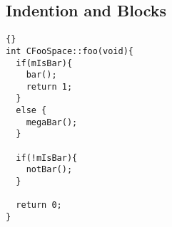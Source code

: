 \documentclass[final,a4paper,10pt, oneside]{article}
\begin{document}
\newpage
\subsection{Indention and Blocks} \label{subsec:IndentionAndBlocks}
\begin{lstlisting}[frame=trbl]{}
int CFooSpace::foo(void){
  if(mIsBar){
    bar();
    return 1;
  }
  else {
    megaBar();
  }
    
  if(!mIsBar){
  	notBar();  
  }
  
  return 0;
}
\end{lstlisting}
\end{document}
